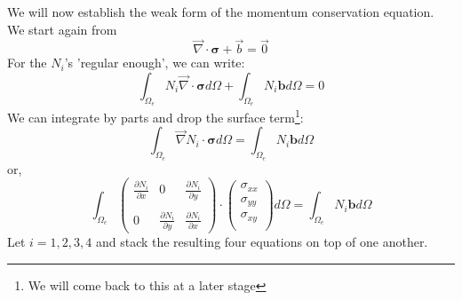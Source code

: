 We will now establish the weak form of the momentum conservation equation. 
We start again from 
\[
{\vec \nabla}\cdot {\bm \sigma} + {\vec b} = {\vec 0} 
\]
For the $N_i$'s 'regular enough', we can write:
\[
\int_{\Omega_e} N_i {\vec \nabla}\cdot {\bm \sigma} d\Omega + \int_{\Omega_e} N_i  {\bm b} d\Omega =0
\]
We can integrate by parts and drop the surface term\footnote{We will come back to this at a later stage}:
\[
\int_{\Omega_e} {\vec \nabla } N_i \cdot {\bm \sigma} d\Omega = \int_{\Omega_e} N_i  {\bm b} d\Omega 
\]
or, 
\[
\int_{\Omega_e} 
\left(
\begin{array}{ccc}
\frac{\partial N_i}{\partial x} & 0 & \frac{\partial N_i}{\partial y} \\  \\
0 & \frac{\partial N_i}{\partial y} &  \frac{\partial N_i}{\partial x}  
\end{array}
\right)
\cdot
\left(
\begin{array}{c}
\sigma_{xx}\\
\sigma_{yy}\\
\sigma_{xy}\\
\end{array}
\right)
d\Omega = \int_{\Omega_e} N_i {\bm b} d\Omega 
\]
Let $i=1,2,3,4$ and stack the resulting four equations on top of one another. 

